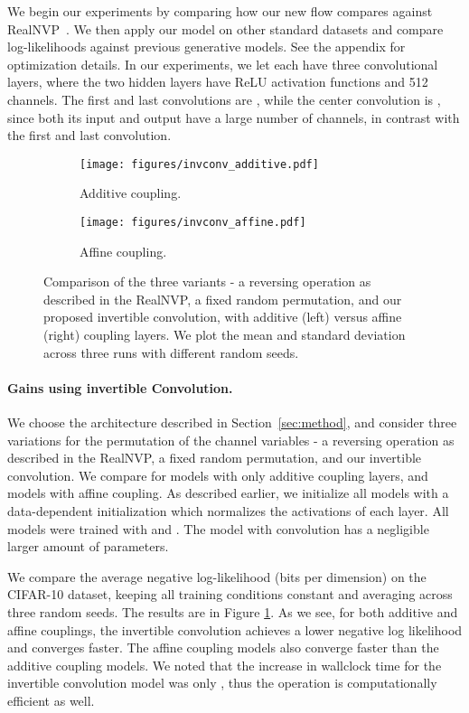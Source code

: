 \documentclass{article}
\begin{document}
We begin our experiments by comparing how our new flow compares against RealNVP~\citep{dinh2016density}. We then apply our model on other standard datasets and compare log-likelihoods against previous generative models. See the appendix for optimization details. In our experiments, we let each  have three convolutional layers, where the two hidden layers have ReLU activation functions and 512 channels. The first and last convolutions are , while the center convolution is , since both its input and output have a large number of channels, in contrast with the first and last convolution.

\begin{figure}
	\centering
	\begin{subfigure}{0.5\textwidth}
    	\texttt{[image: figures/invconv\_additive.pdf]}
    	\caption{Additive coupling.}
    \end{subfigure}\begin{subfigure}{0.5\textwidth}
    	\texttt{[image: figures/invconv\_affine.pdf]}
    	\caption{Affine coupling.}
    \end{subfigure}\caption{Comparison of the three variants - a reversing operation as described in the RealNVP, a fixed random permutation, and our proposed invertible  convolution, with additive (left) versus affine (right) coupling layers. We plot the mean and standard deviation across three runs with different random seeds.}
	\label{fig:invconv}
\end{figure}

\paragraph{Gains using invertible  Convolution.} We choose the architecture described in Section~\ref{sec:method}, and consider three variations for the permutation of the channel variables - a reversing operation as described in the RealNVP, a fixed random permutation, and our invertible  convolution. We compare for models with only additive coupling layers, and models with affine coupling. As described earlier, we initialize all models with a data-dependent initialization which normalizes the activations of each layer. All models were trained with  and . The model with  convolution has a negligible  larger amount of parameters.

We compare the average negative log-likelihood (bits per dimension) on the CIFAR-10 \citep{krizhevsky2009learning} dataset, keeping all training conditions constant and averaging across three random seeds. The results are in Figure \ref{fig:invconv}. As we see, for both additive and affine couplings, the invertible  convolution achieves a lower negative log likelihood and converges faster. The affine coupling models also converge faster than the additive coupling models. We noted that the increase in wallclock time for the invertible  convolution model was only , thus the operation is computationally efficient as well.
\end{document}
